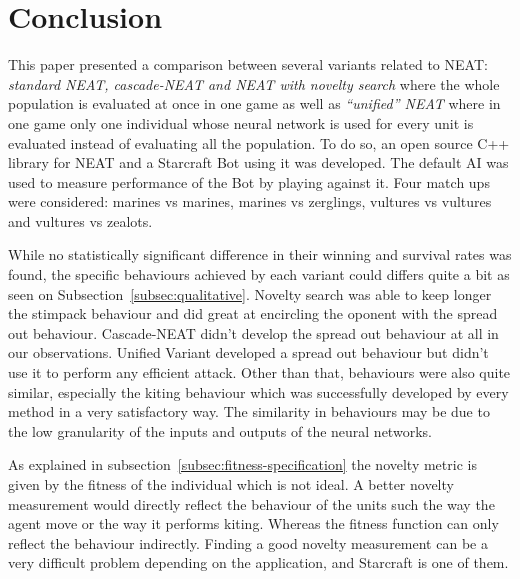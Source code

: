 \section{Conclusion}\label{section:conclusion}

This paper presented a comparison between several variants related to
NEAT: \emph{standard NEAT, cascade-NEAT and NEAT with novelty search}
where the whole population is evaluated at once in one game as well as
\emph{``unified'' NEAT} where in one game only one individual whose
neural network is used for every unit is evaluated instead of
evaluating all the population.  To do so, an open source C++ library
for NEAT and a Starcraft Bot using it was developed.  The default AI
was used to measure performance of the Bot by playing against it.
Four match ups were considered: marines vs marines, marines vs
zerglings, vultures vs vultures and vultures vs zealots.

While no statistically significant difference in their winning and
survival rates was found, the specific behaviours achieved by each
variant could differs quite a bit as seen on
Subsection~\ref{subsec:qualitative}. Novelty search was able to keep
longer the stimpack behaviour and did great at encircling the oponent
with the spread out behaviour.  Cascade-NEAT didn't develop the spread
out behaviour at all in our observations.  Unified Variant developed a
spread out behaviour but didn't use it to perform any efficient
attack.  Other than that, behaviours were also quite similar,
especially the kiting behaviour which was successfully developed by
every method in a very satisfactory way. The similarity in behaviours
may be due to the low granularity of the inputs and outputs of the
neural networks.

As explained in subsection~\ref{subsec:fitness-specification} the
novelty metric is given by the fitness of the individual which is not
ideal. A better novelty measurement would directly reflect the
behaviour of the units such the way the agent move or the way it
performs kiting. Whereas the fitness function can only reflect the
behaviour indirectly. Finding a good novelty measurement can be a very
difficult problem depending on the application, and Starcraft is one
of them.


